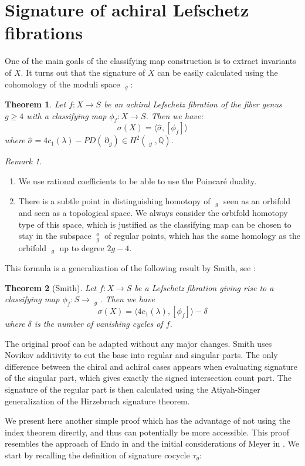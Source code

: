 \documentclass{article}
\DeclareMathOperator{\dm}{\overline{\mathcal{M}}}
\DeclareMathOperator{\sdiv}{\partial \dm}
\theoremstyle{plain}
\newtheorem{thm}{Theorem}[section]
\theoremstyle{remark}
\newtheorem*{rem}{Remark}
\theoremstyle{definition}
\begin{document}
\section{Signature of achiral Lefschetz fibrations}\label{section:signature}
One of the main goals of the classifying map construction is to extract invariants of $X$. It turns out that the signature of $X$ can be easily calculated using the cohomology of the moduli space $\dm_g$\thinspace:
\begin{thm}\label{thm:main2}
    Let $f:X\to S$ be an achiral Lefschetz fibration of the fiber genus $g\geq 4$ with a classifying map $\phi_f : X\to S$. Then we have\thinspace:
    $$\sigma(X) = \langle \hat\sigma, [\phi_f]\rangle$$
    where $\hat{\sigma} = 4c_1(\lambda)-PD(\sdiv_g)\in H^2(\dm_g,\mathbb{Q})$. 
\end{thm}
\begin{rem}
\begin{enumerate}
    \item We use rational coefficients to be able to use the Poincaré duality. 
    \item There is a subtle point in distinguishing homotopy of $\dm_g$ seen as an orbifold and seen as a topological space. We always consider the orbifold homotopy type of this space, which is justified as the classifying map can be chosen to stay in the subspace $\dm_g^o$ of regular points, which has the same homology as the orbifold $\dm_g$ up to degree $2g-4$.
\end{enumerate}
\end{rem}
This formula is a generalization of the following result by Smith, see \cite{Smith1}\thinspace:
\begin{thm}[Smith]
    Let $f:X\to S$ be a Lefschetz fibration giving rise to a classifying map $\phi_f: S\to \dm_g$. Then we have 
    $$\sigma(X) = \langle4c_1(\lambda), [\phi_f]\rangle - \delta$$
    where $\delta$ is the number of vanishing cycles of $f$.
\end{thm}
The original proof can be adapted without any major changes. Smith uses Novikov additivity to cut the base into regular and singular parts. The only difference between the chiral and achiral cases appears when evaluating signature of the singular part, which gives exactly the signed intersection count part. The signature of the regular part is then calculated using the Atiyah-Singer generalization of the Hirzebruch signature theorem. \par 
We present here another simple proof which has the advantage of not using the index theorem directly, and thus can potentially be more accessible. This proof resembles the approach of Endo in \cite{Endo} and the initial considerations of Meyer in \cite{Meyer}. We start by recalling the definition of signature cocycle $\tau_g$\thinspace:
\end{document}
